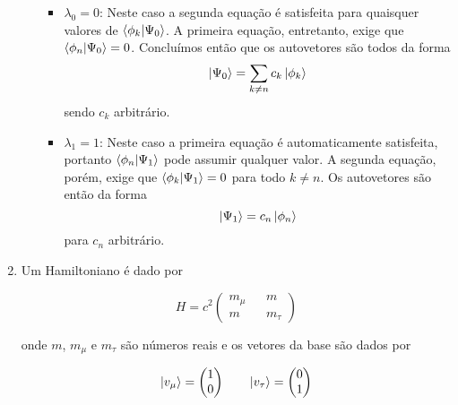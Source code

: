 \documentclass[a4paper, 12pt, notitlepage]{article}
\begin{document}
\begin{enumerate}
\begin{enumerate}[(A)]
\begin{itemize}
      \item $\lambda_0 = 0$:
      Neste caso a segunda equação é satisfeita para quaisquer valores de $\bra{\phi_k}\ket{\Psi_0}$. A primeira equação, entretanto, exige que $\bra{\phi_n}\ket{\Psi_0} = 0$. Concluímos então que os autovetores são todos da forma
      \[ \ket{\Psi_0} = \sum_{k\neq n} c_k \ket{\phi_k} \]
      \noindent sendo $c_k$ arbitrário.
      \item $\lambda_1 = 1$:
      Neste caso a primeira equação é automaticamente satisfeita, portanto $\bra{\phi_n}\ket{\Psi_1}$ pode assumir qualquer valor. A segunda equação, porém, exige que $\bra{\phi_k}\ket{\Psi_1} = 0$ para todo $k \neq n$. Os autovetores são então da forma
      \[ \ket{\Psi_1} = c_n \ket{\phi_n} \]
      \noindent para $c_n$ arbitrário.
    \end{itemize}
  \end{enumerate}

\item Um Hamiltoniano é dado por

\begin{equation}\label{eq:H.neutrinos}
  H = c^2
    \begin{pmatrix}
    m_\mu && m \\
    m && m_\tau
    \end{pmatrix}
\end{equation}

\noindent onde $m$, $m_\mu$ e $m_\tau$ são números reais e os vetores da base são dados por

\begin{equation*}
  \ket{v_\mu} = \begin{pmatrix} 1 \\ 0\end{pmatrix} \qquad
  \ket{v_\tau} = \begin{pmatrix} 0 \\ 1\end{pmatrix}
\end{equation*}


\end{enumerate}
\end{document}
